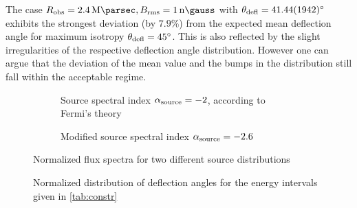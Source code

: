 \begin{description}
        The case $\Robserver=\SI{2.4}{\mega\parsec}, \Brms=\SI{1}{\nano\gauss}$
        with $\ablenkung=\SI{41.44(1942)}{\degree}$ exhibits the strongest
        deviation (by $7.9\%$) from the expected mean deflection angle for
        maximum isotropy $\ablenkung=\SI{45}{\degree}$. This is also reflected
        by the slight irregularities of the respective deflection angle
        distribution. However one can argue that the deviation of the mean
        value and the bumps in the distribution still fall within the
        acceptable regime.

\end{description}


\begin{landscape}

\begin{figure}[t]
    \begin{subfigure}[t]{\textwidth}
        \centering
        
        \caption{Source spectral index $\alphasource=-2$, according to Fermi's theory}
        \label{fig:constraints-fermi}
        \vspace*{\baselineskip}
    \end{subfigure}

    \begin{subfigure}[t]{\textwidth}
        \centering
        
        \caption{Modified source spectral index $\alphasource=-2.6$}
        \label{fig:constraints-mod}
    \end{subfigure}
    \caption{Normalized flux spectra for two different source distributions}
    \label{fig:constraints}
\end{figure}

\begin{figure}[p]
    \centering
    
    \caption{Normalized distribution of deflection angles for the energy
        intervals given in \cref{tab:constr}}
    \label{fig:constrains-defl}
\end{figure}


\end{landscape}
